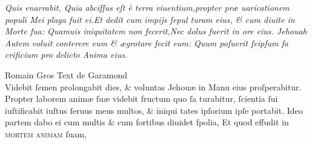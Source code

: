 \documentclass{article}
\begin{document}
{\begin{multicols}{2}
	\columnbreak

	\justifying
	\noindent
	\textit{Quis enarrabit, Quia abciſſus eſt \`e terra viuentium,propter pr\ae{} \linebreak
		uaricationem populi Mei plaga fuit ei.Et dedit cum impijs ſepul\linebreak
		turam eius, \& cum diuite in Morte ſua: Quamuis iniquitatem\linebreak
		non fecerit,Nec dolus fuerit in ore eius. Jehouah Autem voluit\linebreak
		conterere eum \& \ae{}grotare fecit eum: Quum poſuerit ſeipſum ſa\linebreak
		crificium pro delicto Anima eius.}
\end{multicols}
\vspace{-3\baselineskip}
\begin{multicols}{2}
	\tiny
	\centering
	Romain Gros Text de Garamond\\
	\vspace{0.5\baselineskip}
	\small
	\justifying
	\noindent \qquad Videbit ſemen prolongabit dies, \& voluntas Jehou\ae{} in Manu eius\linebreak
	proſperabitur. Propter laborem anim\ae{} ſu\ae{} videbit fructum quo ſa\linebreak
	turabitur, ſcientia ſui iuſtificabit iuſtus ſeruus meus multos, \& iniqui\linebreak
	tates ipſorium ipſe portabit. Ideo partem dabo ei cum multis \& cum\linebreak
	fortibus diuidet ſpolia, Et quod effudit in \textsc{mortem animam} ſuam,\\


\end{multicols}}
\end{document}
